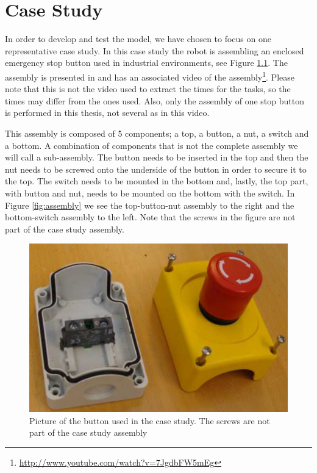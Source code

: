 \chapter{Case Study}\label{cha:assembly}
In order to develop and test the model, we have chosen to focus on one representative case study. In this case study the robot is assembling an enclosed emergency stop button used in industrial environments, see Figure \ref{fig:button}. The assembly is presented in \cite{assembly} and has an associated video of the assembly\footnote{\url{http://www.youtube.com/watch?v=7JgdbFW5mEg}}. Please note that this is not the video used to extract the times for the tasks, so the times may differ from the ones used. Also, only the assembly of one stop button is performed in this thesis, not several as in this video.

This assembly is composed of 5 components; a top, a button, a nut, a switch and a bottom. A combination of components that is not the complete assembly we will call a sub-assembly. The button needs to be inserted in the top and then the nut needs to be screwed onto the underside of the button in order to secure it to the top. The switch needs to be mounted in the bottom and, lastly, the top part, with button and nut, needs to be mounted on the bottom with the switch. In Figure \ref{fig:assembly} we see the top-button-nut assembly to the right and the bottom-switch assembly to the left. Note that the screws in the figure are not part of the case study assembly.

\begin{figure}
\centering
\includegraphics[width=\textwidth/3*2]{Figures/buttonbox.png}
\caption{Picture of the button used in the case study. The screws are not part of the case study assembly}
\label{fig:button}
\end{figure}

